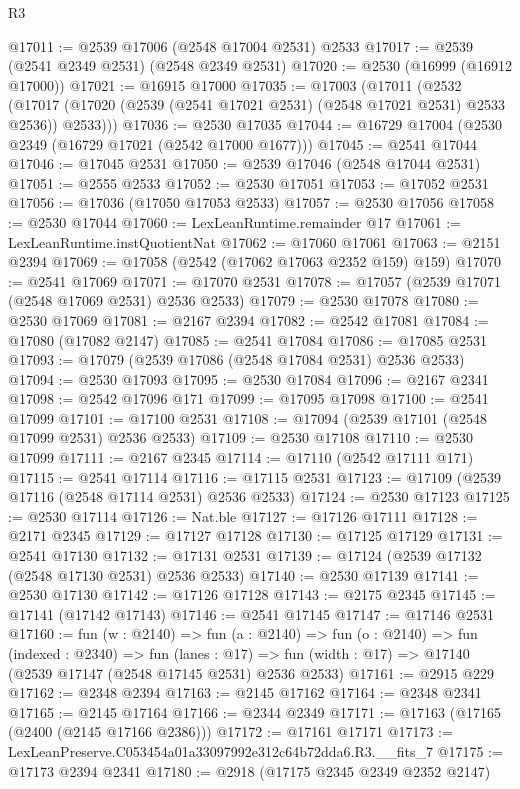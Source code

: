 \begin{lexlean}{R3}
\begin{coremodule}
@17011 := @2539 @17006 (@2548 @17004 @2531) @2533
@17017 := @2539 (@2541 @2349 @2531) (@2548 @2349 @2531)
@17020 := @2530 (@16999 (@16912 @17000))
@17021 := @16915 @17000
@17035 := @17003
    (@17011
      (@2532 (@17017 (@17020 (@2539 (@2541 @17021 @2531) (@2548 @17021 @2531) @2533 @2536)) @2533)))
@17036 := @2530 @17035
@17044 := @16729 @17004 (@2530 @2349 (@16729 @17021 (@2542 @17000 @1677)))
@17045 := @2541 @17044
@17046 := @17045 @2531
@17050 := @2539 @17046 (@2548 @17044 @2531)
@17051 := @2555 @2533
@17052 := @2530 @17051
@17053 := @17052 @2531
@17056 := @17036 (@17050 @17053 @2533)
@17057 := @2530 @17056
@17058 := @2530 @17044
@17060 := LexLeanRuntime.remainder @17
@17061 := LexLeanRuntime.instQuotientNat
@17062 := @17060 @17061
@17063 := @2151 @2394
@17069 := @17058 (@2542 (@17062 @17063 @2352 @159) @159)
@17070 := @2541 @17069
@17071 := @17070 @2531
@17078 := @17057 (@2539 @17071 (@2548 @17069 @2531) @2536 @2533)
@17079 := @2530 @17078
@17080 := @2530 @17069
@17081 := @2167 @2394
@17082 := @2542 @17081
@17084 := @17080 (@17082 @2147)
@17085 := @2541 @17084
@17086 := @17085 @2531
@17093 := @17079 (@2539 @17086 (@2548 @17084 @2531) @2536 @2533)
@17094 := @2530 @17093
@17095 := @2530 @17084
@17096 := @2167 @2341
@17098 := @2542 @17096 @171
@17099 := @17095 @17098
@17100 := @2541 @17099
@17101 := @17100 @2531
@17108 := @17094 (@2539 @17101 (@2548 @17099 @2531) @2536 @2533)
@17109 := @2530 @17108
@17110 := @2530 @17099
@17111 := @2167 @2345
@17114 := @17110 (@2542 @17111 @171)
@17115 := @2541 @17114
@17116 := @17115 @2531
@17123 := @17109 (@2539 @17116 (@2548 @17114 @2531) @2536 @2533)
@17124 := @2530 @17123
@17125 := @2530 @17114
@17126 := Nat.ble
@17127 := @17126 @17111
@17128 := @2171 @2345
@17129 := @17127 @17128
@17130 := @17125 @17129
@17131 := @2541 @17130
@17132 := @17131 @2531
@17139 := @17124 (@2539 @17132 (@2548 @17130 @2531) @2536 @2533)
@17140 := @2530 @17139
@17141 := @2530 @17130
@17142 := @17126 @17128
@17143 := @2175 @2345
@17145 := @17141 (@17142 @17143)
@17146 := @2541 @17145
@17147 := @17146 @2531
@17160 := fun (w : @2140) =>
  fun (a : @2140) =>
  fun (o : @2140) =>
  fun (indexed : @2340) =>
  fun (lanes : @17) => fun (width : @17) => @17140 (@2539 @17147 (@2548 @17145 @2531) @2536 @2533)
@17161 := @2915 @229
@17162 := @2348 @2394
@17163 := @2145 @17162
@17164 := @2348 @2341
@17165 := @2145 @17164
@17166 := @2344 @2349
@17171 := @17163 (@17165 (@2400 (@2145 @17166 @2386)))
@17172 := @17161 @17171
@17173 := LexLeanPreserve.C053454a01a33097992e312c64b72dda6.R3.__fits_7
@17175 := @17173 @2394 @2341
@17180 := @2918 (@17175 @2345 @2349 @2352 @2147)

\end{coremodule}
\end{lexlean}
